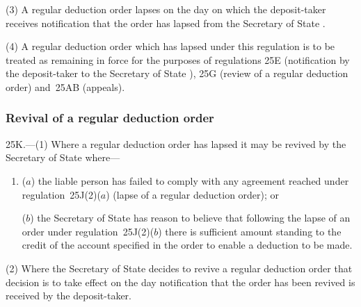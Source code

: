 \documentclass[12pt,a4paper]{article}
\begin{document}
(3) A regular deduction order lapses on the day on which the deposit-taker receives notification that the order has lapsed from the 
Secretary of State%
.

(4) A regular deduction order which has lapsed under this regulation is to be treated as remaining in force for the purposes of regulations 25E (notification by the deposit-taker to the 
Secretary of State%
), 25G (review of a regular deduction order) and~25AB (appeals).


\subsubsection[25K. Revival of a regular deduction order]{Revival of a regular deduction order}

25K.---(1)  Where a regular deduction order has lapsed it may be revived by the 
Secretary of State  %
where—
\begin{enumerate}\item[]
($a$) the liable person has failed to comply with any agreement reached under regulation~25J(2)($a$)  (lapse of a regular deduction order); or

($b$) the 
Secretary of State  %
has reason to believe that following the lapse of an order under regulation~25J(2)($b$)  there is sufficient amount standing to the credit of the account specified in the order to enable a deduction to be made.
\end{enumerate}

(2) Where the 
Secretary of State  %
decides to revive a regular deduction order that decision is to take effect on the day notification that the order has been revived is received by the deposit-taker.

\end{document}
